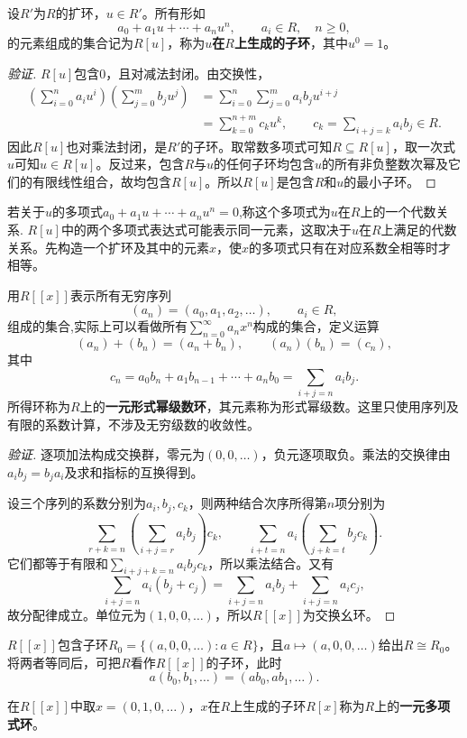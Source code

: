 \begin{definition}\label{p2:concept:c3-generated-subring}
设$R'$为$R$的扩环，$u\in R'$。所有形如
\[
a_0+a_1u+\cdots+a_nu^n,\qquad a_i\in R,\quad n\ge0,
\]
的元素组成的集合记为$R[u]$，称为\textbf{$u$在$R$上生成的子环}，其中$u^0=1$。
\end{definition}
\begin{proof}[验证]
$R[u]$包含$0$，且对减法封闭。由交换性，
\begin{align*}
\left(\sum_{i=0}^n a_i u^i\right)
\left(\sum_{j=0}^m b_j u^j\right)
&=\sum_{i=0}^n\sum_{j=0}^m a_i b_j u^{i+j}\\
&=\sum_{k=0}^{n+m}c_k u^k,
\qquad c_k=\sum_{i+j=k}a_i b_j\in R.
\end{align*}
因此$R[u]$也对乘法封闭，是$R'$的子环。取常数多项式可知$R\subseteq R[u]$，取一次式$u$可知$u\in R[u]$。反过来，包含$R$与$u$的任何子环均包含$u$的所有非负整数次幂及它们的有限线性组合，故均包含$R[u]$。所以$R[u]$是包含$R$和$u$的最小子环。
\end{proof}
\label{p2:concept:c3-algebraic-relation}若关于$u$的多项式$a_0+a_1 u +\cdots +a_n u^n=0$,称这个多项式为$u$在$R$上的一个代数关系.
$R[u]$中的两个多项式表达式可能表示同一元素，这取决于$u$在$R$上满足的代数关系。先构造一个扩环及其中的元素$x$，使$x$的多项式只有在对应系数全相等时才相等。

\begin{definition}\label{p2:concept:c3-formal-series}
用$R[[x]]$表示所有无穷序列
\[
(a_n)=(a_0,a_1,a_2,\ldots),\qquad a_i\in R,
\]
组成的集合,实际上可以看做所有$\sum\limits_{n=0}^{\infty}a_n x^n$构成的集合，定义运算
\[
(a_n)+(b_n)=(a_n+b_n),\qquad (a_n)(b_n)=(c_n),
\]
其中
\[
c_n=a_0b_n+a_1b_{n-1}+\cdots+a_nb_0
=\sum_{i+j=n}a_i b_j.
\]
所得环称为$R$上的\textbf{一元形式幂级数环}，其元素称为形式幂级数。这里只使用序列及有限的系数计算，不涉及无穷级数的收敛性。
\end{definition}
\begin{proof}[验证]
逐项加法构成交换群，零元为$(0,0,\ldots)$，负元逐项取负。乘法的交换律由$a_i b_j=b_j a_i$及求和指标的互换得到。

设三个序列的系数分别为$a_i,b_j,c_k$，则两种结合次序所得第$n$项分别为
\[
\sum_{r+k=n}\left(\sum_{i+j=r}a_i b_j\right)c_k,
\qquad
\sum_{i+t=n}a_i\left(\sum_{j+k=t}b_j c_k\right).
\]
它们都等于有限和$\sum_{i+j+k=n}a_i b_j c_k$，所以乘法结合。又有
\[
\sum_{i+j=n}a_i(b_j+c_j)
=\sum_{i+j=n}a_i b_j+\sum_{i+j=n}a_i c_j,
\]
故分配律成立。单位元为$(1,0,0,\ldots)$，所以$R[[x]]$为交换幺环。


\end{proof}
$R[[x]]$包含子环$R_0=\{(a,0,0,\ldots):a\in R\}$，且$a\mapsto(a,0,0,\ldots)$给出$R\cong R_0$。将两者等同后，可把$R$看作$R[[x]]$的子环，此时
\[
a(b_0,b_1,\ldots)=(ab_0,ab_1,\ldots).
\]
\begin{definition}\label{p2:concept:c3-polynomial-ring}
在$R[[x]]$中取$x=(0,1,0,\ldots)$，$x$在$R$上生成的子环$R[x]$称为$R$上的\textbf{一元多项式环}。
\end{definition}

